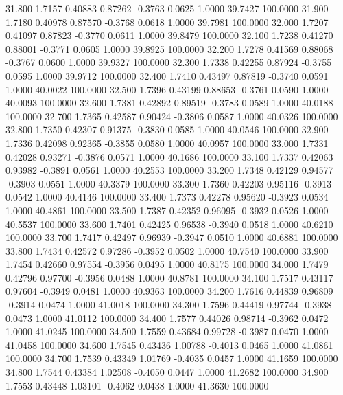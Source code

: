   31.800   1.7157   0.40883   0.87262  -0.3763   0.0625   1.0000  39.7427 100.0000
  31.900   1.7180   0.40978   0.87570  -0.3768   0.0618   1.0000  39.7981 100.0000
  32.000   1.7207   0.41097   0.87823  -0.3770   0.0611   1.0000  39.8479 100.0000
  32.100   1.7238   0.41270   0.88001  -0.3771   0.0605   1.0000  39.8925 100.0000
  32.200   1.7278   0.41569   0.88068  -0.3767   0.0600   1.0000  39.9327 100.0000
  32.300   1.7338   0.42255   0.87924  -0.3755   0.0595   1.0000  39.9712 100.0000
  32.400   1.7410   0.43497   0.87819  -0.3740   0.0591   1.0000  40.0022 100.0000
  32.500   1.7396   0.43199   0.88653  -0.3761   0.0590   1.0000  40.0093 100.0000
  32.600   1.7381   0.42892   0.89519  -0.3783   0.0589   1.0000  40.0188 100.0000
  32.700   1.7365   0.42587   0.90424  -0.3806   0.0587   1.0000  40.0326 100.0000
  32.800   1.7350   0.42307   0.91375  -0.3830   0.0585   1.0000  40.0546 100.0000
  32.900   1.7336   0.42098   0.92365  -0.3855   0.0580   1.0000  40.0957 100.0000
  33.000   1.7331   0.42028   0.93271  -0.3876   0.0571   1.0000  40.1686 100.0000
  33.100   1.7337   0.42063   0.93982  -0.3891   0.0561   1.0000  40.2553 100.0000
  33.200   1.7348   0.42129   0.94577  -0.3903   0.0551   1.0000  40.3379 100.0000
  33.300   1.7360   0.42203   0.95116  -0.3913   0.0542   1.0000  40.4146 100.0000
  33.400   1.7373   0.42278   0.95620  -0.3923   0.0534   1.0000  40.4861 100.0000
  33.500   1.7387   0.42352   0.96095  -0.3932   0.0526   1.0000  40.5537 100.0000
  33.600   1.7401   0.42425   0.96538  -0.3940   0.0518   1.0000  40.6210 100.0000
  33.700   1.7417   0.42497   0.96939  -0.3947   0.0510   1.0000  40.6881 100.0000
  33.800   1.7434   0.42572   0.97286  -0.3952   0.0502   1.0000  40.7540 100.0000
  33.900   1.7454   0.42660   0.97554  -0.3956   0.0495   1.0000  40.8175 100.0000
  34.000   1.7479   0.42796   0.97700  -0.3956   0.0488   1.0000  40.8781 100.0000
  34.100   1.7517   0.43117   0.97604  -0.3949   0.0481   1.0000  40.9363 100.0000
  34.200   1.7616   0.44839   0.96809  -0.3914   0.0474   1.0000  41.0018 100.0000
  34.300   1.7596   0.44419   0.97744  -0.3938   0.0473   1.0000  41.0112 100.0000
  34.400   1.7577   0.44026   0.98714  -0.3962   0.0472   1.0000  41.0245 100.0000
  34.500   1.7559   0.43684   0.99728  -0.3987   0.0470   1.0000  41.0458 100.0000
  34.600   1.7545   0.43436   1.00788  -0.4013   0.0465   1.0000  41.0861 100.0000
  34.700   1.7539   0.43349   1.01769  -0.4035   0.0457   1.0000  41.1659 100.0000
  34.800   1.7544   0.43384   1.02508  -0.4050   0.0447   1.0000  41.2682 100.0000
  34.900   1.7553   0.43448   1.03101  -0.4062   0.0438   1.0000  41.3630 100.0000
